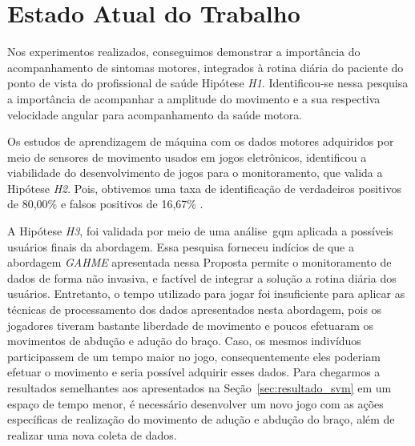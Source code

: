 \chapter{Estado Atual do Trabalho}\label{chapter:trabalhos_futuros}
Nos experimentos realizados, conseguimos demonstrar a importância do acompanhamento de sintomas motores, integrados à rotina diária do paciente do ponto de vista do profissional de saúde Hipótese \textit{H1}. Identificou-se nessa pesquisa a importância de acompanhar a amplitude do movimento e a sua respectiva velocidade angular para acompanhamento da saúde motora.

Os estudos de aprendizagem de máquina com os dados motores adquiridos por meio de sensores de movimento usados em jogos eletrônicos, identificou a viabilidade do desenvolvimento de jogos para o monitoramento, que valida a Hipótese \textit{H2}. Pois, obtivemos uma taxa de identificação de verdadeiros positivos de 80,00\% e falsos positivos de 16,67\% .

A Hipótese \textit{H3}, foi validada por meio de uma análise~\ac{gqm} aplicada a possíveis usuários finais da abordagem. Essa pesquisa forneceu indícios de que a abordagem \textit{GAHME} apresentada nessa Proposta permite o monitoramento de dados de forma não invasiva, e factível de integrar a solução a rotina diária dos usuários. Entretanto, o tempo utilizado para jogar foi insuficiente para aplicar as técnicas de processamento dos dados apresentados nesta abordagem, pois os jogadores tiveram bastante liberdade de movimento e poucos efetuaram os movimentos de abdução e adução do braço. Caso, os mesmos indivíduos participassem de um tempo maior no jogo, consequentemente eles poderiam efetuar o movimento e seria possível adquirir esses dados. Para chegarmos a resultados semelhantes aos apresentados na Seção~\ref{sec:resultado_svm} em um espaço de tempo menor, é necessário desenvolver um novo jogo com as ações específicas de realização do movimento de adução e abdução do braço, além de realizar uma nova coleta de dados.

